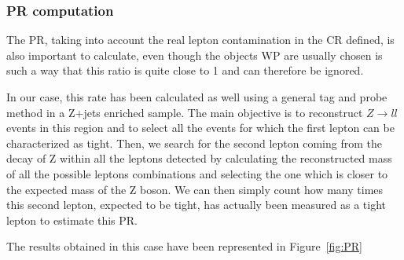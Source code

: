 \documentclass[a4paper, 10pt, openright]{report}
\begin{document}
\subsubsection*{\acf{PR} computation}

The \ac{PR}, taking into account the real lepton contamination in the \ac{CR} defined, is also important to calculate, even though the objects \ac{WP} are usually chosen is such a way that this ratio is quite close to 1 and can therefore be ignored.

In our case, this rate has been calculated as well using a general tag and probe method in a Z+jets enriched sample. The main objective is to reconstruct $Z \rightarrow ll$ events in this region and to select all the events for which the first lepton can be characterized as tight. Then, we search for the second lepton coming from the decay of Z within all the leptons detected by calculating the reconstructed mass of all the possible leptons combinations and selecting the one which is closer to the expected mass of the Z boson. We can then simply count how many times this second lepton, expected to be tight, has actually been measured as a tight lepton to estimate this \ac{PR}.

The results obtained in this case have been represented in Figure~\ref{fig:PR}
\end{document}
